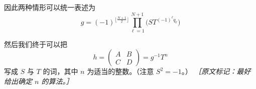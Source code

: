 因此两种情形可以统一表述为
\begin{equation}
  g=(-1)^{\lfloor\frac{N+1}{2}\rfloor}\prod_{\ell=1}^{N+1}\big(ST^{(-1)^\ell q_\ell}\big)
  \tag{C.26}
  \label{eq:C.26}
\end{equation}

然后我们终于可以把
\begin{equation}
  h=\begin{pmatrix}
    A & B\\
    C & D
  \end{pmatrix}=g^{-1}T^n
  \tag{C.27}
  \label{eq:C.27}
\end{equation}
写成 $S$ 与 $T$ 的词，其中 $n$ 为适当的整数。（注意 $S^2=-1$。）
{\small\itshape ［原文标记：最好给出确定 $n$ 的算法。］}

